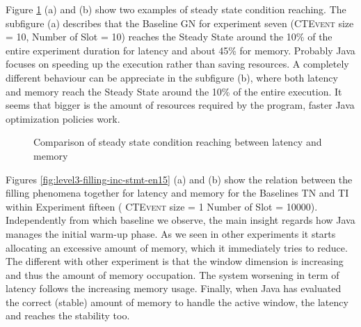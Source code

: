 Figure \ref{fig:level3-steady-naive-graph-en7-12} (a) and (b) show two examples of steady state condition reaching. The subfigure (a) describes that the Baseline GN for experiment seven (\textsc{CTEvent} size = 10, Number of Slot = 10) reaches the Steady State around the 10\% of the entire experiment duration for latency and about 45\% for memory. 
Probably Java focuses on speeding up the execution rather than saving resources. A completely different behaviour can be appreciate in the subfigure (b), where both latency and memory reach the Steady State around the 10\% of the entire execution. It seems that bigger is the amount of resources required by the program, faster Java optimization policies work.


\begin{figure}[tbh]
  \centering
  	\label{fig:level3-steady-naive-graph-en7-12}  	
  	\caption{Comparison of steady state condition reaching between latency and memory} 
\end{figure}

Figures \ref{fig:level3-filling-inc-stmt-en15} (a) and (b) show the relation between the filling phenomena together for latency and memory for the Baselines TN and TI within Experiment fifteen ( \textsc{CTEvent} size = 1 Number of Slot = 10000). Independently from which baseline we observe, the main insight regards how Java manages the initial warm-up phase. As we seen in other experiments it starts allocating an excessive amount of memory, which it immediately tries to reduce. The different with other experiment is that the window dimension is increasing and thus the amount of memory occupation. The system worsening in term of latency follows the increasing memory usage. Finally, when Java has evaluated the correct (stable) amount of memory to handle the active window, the latency and reaches the stability too.

